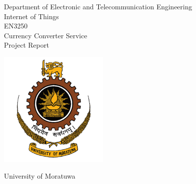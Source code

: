 \begin{titlepage}

    \begin{center}
    
        {\fontsize{22}{27}\selectfont Department of Electronic and Telecommunication Engineering} 
	\vspace{\baselineskip}
	\vspace{\baselineskip}
        {\fontsize{20}{24}\selectfont \\Internet of Things}  
        {\fontsize{16}{19}\selectfont \\EN3250} 
    \vspace{\baselineskip}
	\vspace{\baselineskip}
        {\fontsize{20}{24}\selectfont \\Currency Converter Service}  
	   {\fontsize{20}{24}\selectfont \\Project Report\\} 
		\vspace{\baselineskip}
    \end{center}

   \begin{center}
        \includegraphics[width=0.4\textwidth]{images/uom.png}
    \end{center}
   \begin{center}   
      {\fontsize{16}{19}\selectfont University of Moratuwa\\}   
      \vspace{\baselineskip}
    \end{center}

\begin{flushleft}

{\fontsize{16}{19}\selectfont
{}

}
\end{flushleft}
\end{titlepage}
